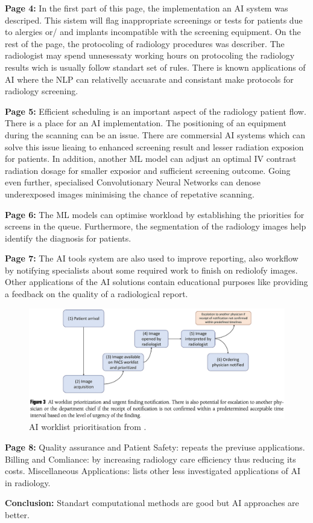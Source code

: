     \textbf{Page 4:}
    In the first part of this page, the implementation an AI system was descriped. This sistem will flag inappropriate screenings or tests for patients due to alergies or/ and implants incompatible with the screening equipment. On the rest of the page, the protocoling of radiology procedures was describer. The radiologist may spend unnesessaty working hours on protocoling the radiology results wich is usually follow standart set of rules. There is known applications of AI where the NLP can relativelly accuarate and consistant make protocols for radiology screening. 

    \textbf{Page 5:}
    Efficient scheduling is an important aspect of the radiology patient flow. There is a place for an AI implementation. The positioning of an equipment during the scanning can be an issue. There are commersial AI systems which can solve this issue lieaing to enhanced screening result and lesser radiation exposion for patients. In addition, another ML model can adjust an optimal IV contrast radiation dosage for smaller exposior and sufficient screening outcome. Going even further, specialised Convolutionary Neural Networks can denose underexposed  images minimising the chance of repetative scanning.
    
    \textbf{Page 6:}
    The ML models can optimise workload by establishing the priorities for screens in the queue. Furthermore, the segmentation of the radiology images help identify the diagnosis for patients.
    
    \textbf{Page 7:}
    The AI tools system are also used to improve reporting, also workflow by notifying specialists about some required work to finish on rediolofy images. Other applications of the AI solutions contain educational purposes like providing a feedback on the quality of a radiological report.
    \begin{figure}[H]
        \centering
        \includegraphics[width=1\textwidth]{figures/0012_SR03US23/fig3.png}
        \caption{AI worklist prioritisation from \cite{x076}.}
        \label{fig3:0012_SR03US23}
    \end{figure}

    \textbf{Page 8:}
    Quality assurance and Patient Safety: repeats the previuse applications. Billing and Comliance: by increasing radiology care efficiency thus reducing its costs. Miscellaneous Applications: lists other less investigated applications of AI in radiology.
    
    \textbf{Conclusion:}
    Standart computational methods are good but AI approaches are better.